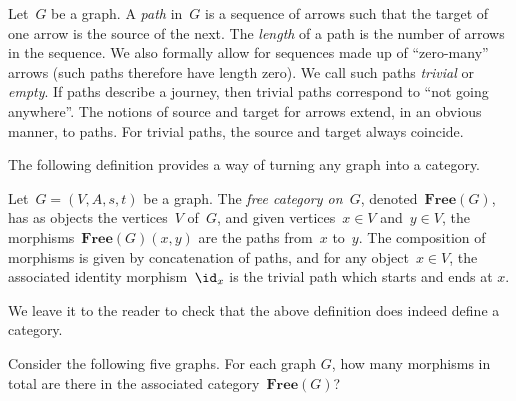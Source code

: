 \begin{definition}[Path]\label{def:path}
    Let~$G$ be a graph. A \emph{path} in~$G$ is a sequence of arrows such that the target of one arrow is the source of the next. The \emph{length} of a path is the number of arrows in the sequence. We also formally allow for sequences made up of ``zero-many'' arrows (such paths therefore have length zero). We call such paths \emph{trivial} or \emph{empty}. If paths describe a journey, then trivial paths correspond to ``not going anywhere''. The notions of source and target for arrows extend, in an obvious manner, to paths. For trivial paths, the source and target always coincide.
\end{definition}

The following definition provides a way of turning any graph into a category.

\begin{ctdefinition}\label{def:free-category}
    Let~$G=(V,A,s,t)$ be a graph. The \emph{free category on~$G$}, denoted~$\mathbf{Free}(G)$, has as objects the vertices~$V$ of~$G$, and given vertices~$x\in V$ and~$y\in V$, the morphisms~$\mathbf{Free}(G)(x,y)$ are the paths from~$x$ to~$y$.
    The composition of morphisms is given by concatenation of paths, and for any object~$x \in V$, the associated identity morphism~$\id_x$ is the trivial path which starts and ends at $x$.
\end{ctdefinition}



We leave it to the reader to check that the above definition does indeed define a category.




\begin{exercise}
    Consider the following five graphs. For each graph $G$, how many morphisms in total are there in the associated category~$\mathbf{Free}(G)$?

    \begin{center}
    \end{center}
\end{exercise}
